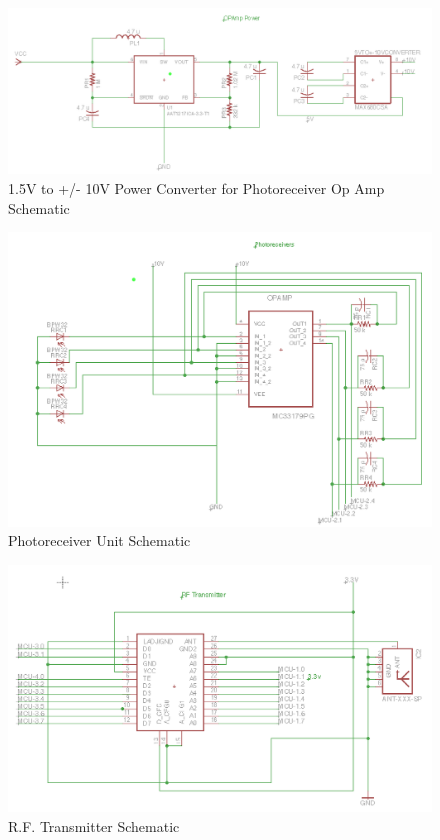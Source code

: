 \documentclass[letterpaper,10pt]{article}
\begin{document}
\begin{spacing}{1.15}
\begin{figure} [H]
	\centering
	\includegraphics[scale=0.5]{Op-Amp-Power.png}
	\caption{1.5V to  +/- 10V Power Converter for Photoreceiver Op Amp Schematic\label{fig:op-amp-power-schematic}}
\end{figure}

\begin{figure} [H]
	\centering
	\includegraphics[scale=0.55]{Photoreceiver.png}
	\caption{Photoreceiver Unit Schematic\label{fig:photoreceiver-schematic}}
\end{figure}

\begin{figure} [H]
	\centering
	\includegraphics[scale=0.5]{RFTransmitter.png}
	\caption{R.F. Transmitter Schematic\label{fig:photoreceiver-schematic}}
\end{figure}


\end{spacing}
\end{document}
